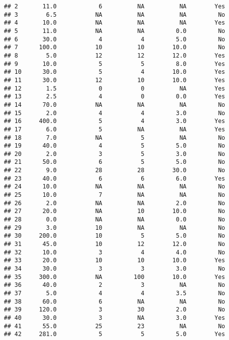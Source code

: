 \documentclass[
]{article}
\begin{document}
\begin{verbatim}
## 2       11.0            6          NA          NA        Yes
## 3        6.5           NA          NA          NA         No
## 4       10.0           NA          NA          NA        Yes
## 5       11.0           NA          NA         0.0         No
## 6       30.0            4           4         5.0         No
## 7      100.0           10          10        10.0         No
## 8        5.0           12          12        12.0        Yes
## 9       10.0            5           5         8.0        Yes
## 10      30.0            5           4        10.0        Yes
## 11      30.0           12          10        10.0        Yes
## 12       1.5            0           0          NA        Yes
## 13       2.5            4           0         0.0        Yes
## 14      70.0           NA          NA          NA         No
## 15       2.0            4           4         3.0         No
## 16     400.0            5           4         3.0        Yes
## 17       6.0            5          NA          NA        Yes
## 18       7.0           NA           5          NA         No
## 19      40.0            4           5         5.0         No
## 20       2.0            3           5         3.0         No
## 21      50.0            6           5         5.0         No
## 22       9.0           28          28        30.0         No
## 23      40.0            6           6         6.0        Yes
## 24      10.0           NA          NA          NA         No
## 25      10.0            7          NA          NA         No
## 26       2.0           NA          NA         2.0         No
## 27      20.0           NA          10        10.0         No
## 28       0.0           NA          NA         0.0         No
## 29       3.0           10          NA          NA         No
## 30     200.0           10           5         5.0         No
## 31      45.0           10          12        12.0         No
## 32      10.0            3           4         4.0         No
## 33      20.0           10          10        10.0        Yes
## 34      30.0            3           3         3.0         No
## 35     300.0           NA         100        10.0        Yes
## 36      40.0            2           3          NA         No
## 37       5.0            4           4         3.5         No
## 38      60.0            6          NA          NA         No
## 39     120.0            3          30         2.0         No
## 40      30.0            3          NA         3.0        Yes
## 41      55.0           25          23          NA         No
## 42     281.0            5           5         5.0        Yes

\end{verbatim}
\end{document}
